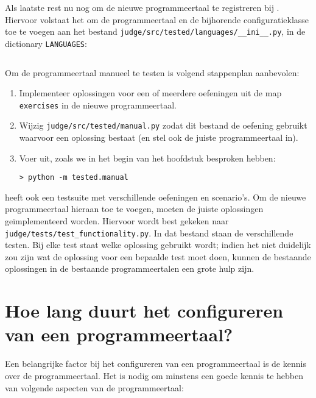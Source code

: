 Als laatste rest nu nog om de nieuwe programmeertaal te registreren bij \tested{}.
Hiervoor volstaat het om de programmeertaal en de bijhorende configuratieklasse toe te voegen aan het bestand \texttt{judge/src/tested/languages/\_\_ini\_\_.py}, in de dictionary \texttt{LANGUAGES}:

\inputminted[firstline=18,lastline=25]{python}{sources/languages-init.py}

Om de programmeertaal manueel te testen is volgend stappenplan aanbevolen:

\begin{enumerate}
    \item Implementeer oplossingen voor een of meerdere oefeningen uit de map \texttt{exercises} in de nieuwe programmeertaal.
    \item Wijzig \texttt{judge/src/tested/manual.py} zodat dit bestand de oefening gebruikt waarvoor een oplossing bestaat (en stel ook de juiste programmeertaal in).
    \item Voer uit, zoals we in het begin van het hoofdstuk besproken hebben:
    
    \begin{verbatim}
> python -m tested.manual
    \end{verbatim}
\end{enumerate}

\tested{} heeft ook een testsuite met verschillende oefeningen en scenario's.
Om de nieuwe programmeertaal hieraan toe te voegen, moeten de juiste oplossingen geïmplementeerd worden.
Hiervoor wordt best gekeken naar \texttt{judge/tests/test\_functionality.py}.
In dat bestand staan de verschillende testen.
Bij elke test staat welke oplossing gebruikt wordt;
indien het niet duidelijk zou zijn wat de oplossing voor een bepaalde test moet doen, kunnen de bestaande oplossingen in de bestaande programmeertalen een grote hulp zijn.

\section{Hoe lang duurt het configureren van een programmeertaal?}\label{sec:hoe-lang-duurt-het-implementeren-van-een-programmeertaal?}

Een belangrijke factor bij het configureren van een programmeertaal is de kennis over de programmeertaal.
Het is nodig om minstens een goede kennis te hebben van volgende aspecten van de programmeertaal:

